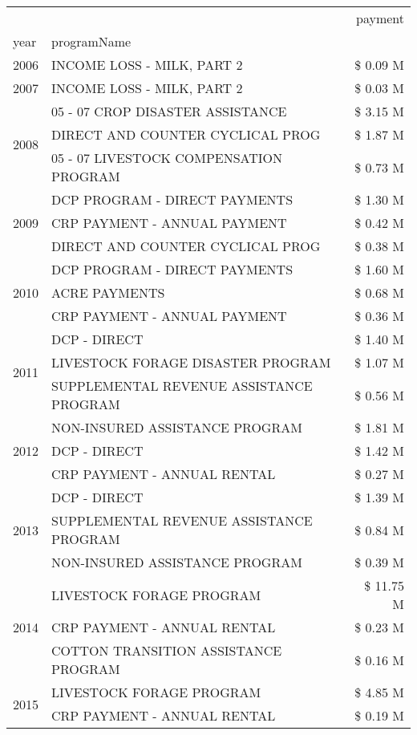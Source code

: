 \begin{tabular}{llr}
\toprule
 &  & payment \\
year & programName &  \\
\midrule
2006 & INCOME LOSS - MILK, PART 2 & \$ 0.09 M \\
\cline{1-3}
2007 & INCOME LOSS - MILK, PART 2 & \$ 0.03 M \\
\cline{1-3}
\multirow[t]{3}{*}{2008} & 05 - 07 CROP DISASTER ASSISTANCE & \$ 3.15 M \\
 & DIRECT AND COUNTER CYCLICAL PROG & \$ 1.87 M \\
 & 05 - 07 LIVESTOCK COMPENSATION PROGRAM & \$ 0.73 M \\
\cline{1-3}
\multirow[t]{3}{*}{2009} & DCP PROGRAM - DIRECT PAYMENTS & \$ 1.30 M \\
 & CRP PAYMENT - ANNUAL PAYMENT & \$ 0.42 M \\
 & DIRECT AND COUNTER CYCLICAL PROG & \$ 0.38 M \\
\cline{1-3}
\multirow[t]{3}{*}{2010} & DCP PROGRAM - DIRECT PAYMENTS & \$ 1.60 M \\
 & ACRE PAYMENTS & \$ 0.68 M \\
 & CRP PAYMENT - ANNUAL PAYMENT & \$ 0.36 M \\
\cline{1-3}
\multirow[t]{3}{*}{2011} & DCP - DIRECT & \$ 1.40 M \\
 & LIVESTOCK FORAGE DISASTER PROGRAM & \$ 1.07 M \\
 & SUPPLEMENTAL REVENUE ASSISTANCE PROGRAM & \$ 0.56 M \\
\cline{1-3}
\multirow[t]{3}{*}{2012} & NON-INSURED ASSISTANCE PROGRAM & \$ 1.81 M \\
 & DCP - DIRECT & \$ 1.42 M \\
 & CRP PAYMENT - ANNUAL RENTAL & \$ 0.27 M \\
\cline{1-3}
\multirow[t]{3}{*}{2013} & DCP - DIRECT & \$ 1.39 M \\
 & SUPPLEMENTAL REVENUE ASSISTANCE PROGRAM & \$ 0.84 M \\
 & NON-INSURED ASSISTANCE PROGRAM & \$ 0.39 M \\
\cline{1-3}
\multirow[t]{3}{*}{2014} & LIVESTOCK FORAGE PROGRAM & \$ 11.75 M \\
 & CRP PAYMENT - ANNUAL RENTAL & \$ 0.23 M \\
 & COTTON TRANSITION ASSISTANCE PROGRAM & \$ 0.16 M \\
\cline{1-3}
\multirow[t]{3}{*}{2015} & LIVESTOCK FORAGE PROGRAM & \$ 4.85 M \\
 & CRP PAYMENT - ANNUAL RENTAL & \$ 0.19 M \\

\end{tabular}
